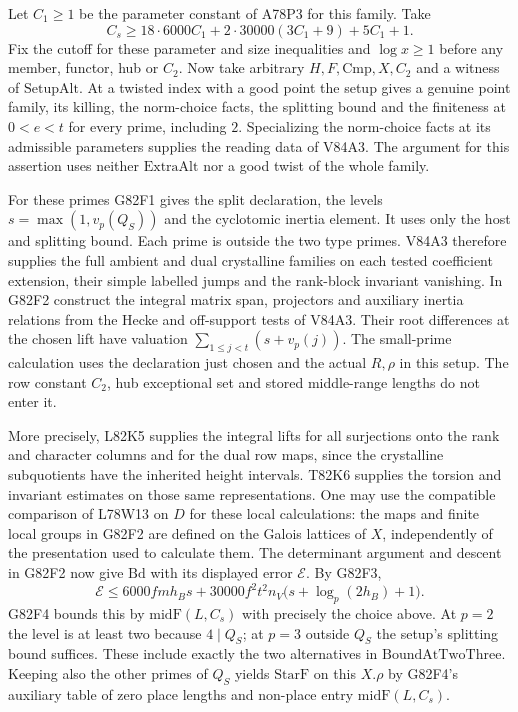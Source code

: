 Let $C_1\ge1$ be the parameter constant of A78P3 for this family.
Take
\[
 C_s\ge18\cdot6000 C_1+2\cdot30000(3C_1+9)+5C_1+1 .
\]
Fix the cutoff for these parameter and size inequalities and
$\log x\ge1$ before any member, functor, hub or $C_2$.
Now take arbitrary $H,F,\mathrm{Cmp},X,C_2$ and a witness
of $\mathrm{SetupAlt}$. At a twisted index with a good point the
setup gives a genuine point family, its killing, the norm-choice
facts, the splitting bound and the finiteness at $0<e<t$ for
every prime, including $2$. Specializing the norm-choice facts
at its admissible parameters supplies the reading data of V84A3.
The argument for this assertion uses neither
$\mathrm{ExtraAlt}$ nor a good twist of the whole family.

For these primes G82F1 gives the split declaration, the levels
$s=\max(1,v_p(Q_S))$ and the cyclotomic inertia element. It uses
only the host and splitting bound. Each prime is outside the two
type primes. V84A3 therefore supplies the full ambient and dual
crystalline families on each tested coefficient extension, their
simple labelled jumps and the rank-block invariant vanishing.
In G82F2 construct the integral matrix span, projectors and
auxiliary inertia relations from the Hecke and off-support tests
of V84A3. Their root differences at the chosen lift have valuation
$\sum_{1\le j<t}(s+v_p(j))$. The small-prime calculation uses
the declaration just chosen and the actual $R,\rho$ in this
setup. The row constant $C_2$, hub exceptional set and stored
middle-range lengths do not enter it.

More precisely, L82K5 supplies the integral lifts for all
surjections onto the rank and character columns and for the
dual row maps, since the crystalline subquotients have the
inherited height intervals. T82K6 supplies the torsion and
invariant estimates on those same representations. One may
use the compatible comparison of L78W13 on $D$ for these local
calculations: the maps and finite local groups in G82F2 are
defined on the Galois lattices of $X$, independently of the
presentation used to calculate them. The determinant argument
and descent in G82F2 now give $\mathrm{Bd}$ with its displayed
error $\mathcal E$. By G82F3,
\[
 \mathcal E\le6000 f m h_B s+
    30000 f^2t^2 n_V\bigl(s+\log_p(2h_B)+1\bigr).
\]
G82F4 bounds this by $\mathrm{midF}(L,C_s)$ with precisely
the choice above. At $p=2$ the level is at least two because
$4\mid Q_S$; at $p=3$ outside $Q_S$ the setup's splitting bound
suffices. These include exactly the two alternatives in
$\mathrm{BoundAtTwoThree}$. Keeping also the other primes of
$Q_S$ yields $\mathrm{StarF}$ on this $X.\rho$ by G82F4's
auxiliary table of zero place lengths and non-place entry
$\mathrm{midF}(L,C_s)$.


